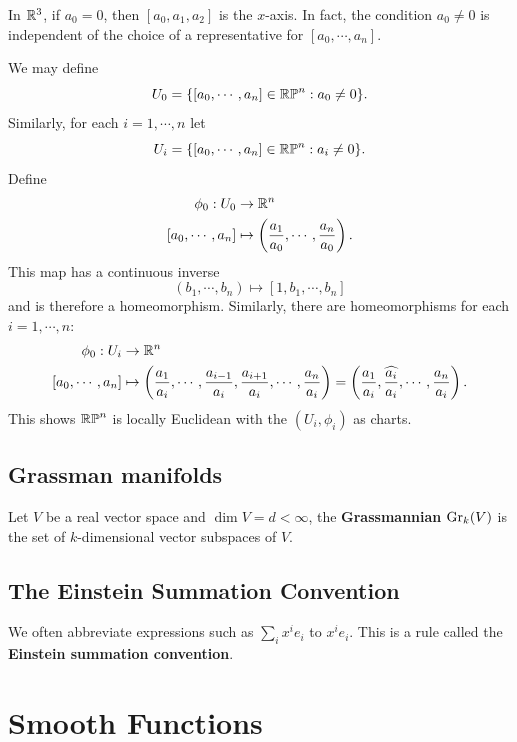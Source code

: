 In $\mathbb{R}^3$, if $a_0 = 0$, then $[a_0, a_1, a_2]$ is the $x$-axis. In fact, the condition $a_0 \neq 0$ is independent of the choice of a representative for $[a_0, \cdots, a_n]$.

We may define 
$$U_0 = \{[a_0,\cdots,a_n] \in \mathbb{RP}^n : a_0 \neq 0 \}.$$
Similarly, for each $i = 1, \cdots, n$ let 
$$U_i = \{[a_0, \cdots, a_n] \in \mathbb{RP}^n: a_i \neq 0\}. $$
Define 
\begin{align*}
    \phi_0:U_0 &\to \mathbb{R}^n \\
    [a_0, \cdots, a_n] &\mapsto \left(\frac{a_1}{a_0}, \cdots, \frac{a_n}{a_0}\right).
\end{align*}
This map has a continuous inverse
$$(b_1, \cdots, b_n) \mapsto [1,b_1, \cdots, b_n]$$
and is therefore a homeomorphism. Similarly, there are homeomorphisms for each $i=1, \cdots, n$:
\begin{align*}
    \phi_0:U_i &\to \mathbb{R}^n \\
    [a_0, \cdots, a_n] &\mapsto \left(\frac{a_1}{a_i}, \cdots, \frac{a_{i-1}}{a_i}, \frac{a_{i+1}}{a_i}, \cdots, \frac{a_n}{a_i}\right) = \left(\frac{a_1}{a_i}, \widehat{\frac{a_i}{a_i}}, \cdots, \frac{a_n}{a_i}\right).
\end{align*}
This shows $\mathbb{RP}^n$ is locally Euclidean with the $(U_i,\phi_i)$ as charts. 


\subsection*{Grassman manifolds}
\begin{example}
    Let $V$ be a real vector space and $\dim V = d < \infty$, the \textbf{Grassmannian} 
    $\mathrm{Gr}_k(V)$ is the set of $k$-dimensional vector subspaces of $V$. 
\end{example}




\subsection*{The Einstein Summation Convention}
We often abbreviate expressions such as $\sum_i x^i e_i$ to $x^i e_i$. This is a rule called the \textbf{Einstein summation convention}. 

\section{Smooth Functions}
